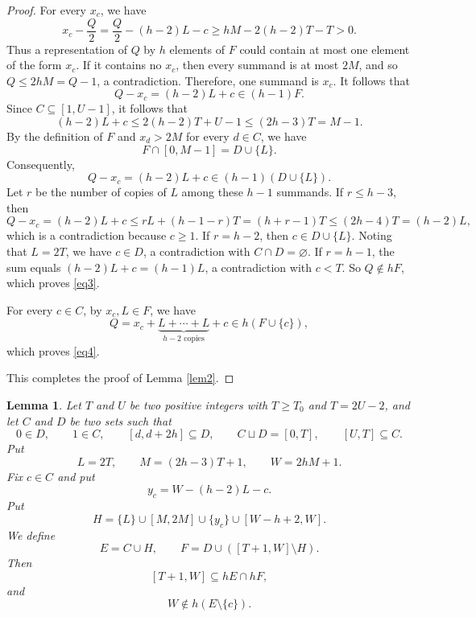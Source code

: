 \documentclass[reqno,12pt,twoside]{article}
\numberwithin{equation}{section}
\newtheorem{lemma}[theorem]{Lemma}
\begin{document}
\begin{proof}
For every $x_c$, we have
\[
 x_c-\frac Q2= \frac Q2-(h-2)L-c
 \ge hM-2(h-2)T-T>0.
\]
Thus a representation of $Q$ by $h$ elements of $F$ could contain at
most one element of the form $x_c$. If it contains no $x_c$, then every summand is at most $2M$, and so
 $Q\leq 2hM=Q-1$, a contradiction. Therefore,
one summand is $x_c$. It follows that
\[
 Q-x_c=(h-2)L+c\in (h-1)F.
\]
Since $C\subseteq[1,U-1]$, it follows that
\[
 (h-2)L+c\le2(h-2)T+U-1\le(2h-3)T=M-1.
\]
By the definition of $F$ and $x_d>2M$ for every $d\in C$, we have
\[
 F\cap[0,M-1]=D\cup\{L\}.
\]
Consequently,
\[
 Q-x_c=(h-2)L+c\in (h-1)(D\cup\{L\}).
\]
Let $r$ be the number of copies of $L$ among these $h-1$ summands.  If
$r\le h-3$, then
\[
 Q-x_c=(h-2)L+c\leq rL+(h-1-r)T=(h+r-1)T\le(2h-4)T=(h-2)L,
\]
which is a contradiction because $c\ge1$.  If
$r=h-2$, then $c\in D\cup\{L\}$.
Noting that $L=2T$, we have $c\in D$, a contradiction with $C\cap D=\varnothing$.
If $r=h-1$, the sum equals $(h-2)L+c=(h-1)L$, a contradiction with $c<T$. So $Q\notin hF$,
which proves \eqref{eq3}.

For every $c\in C$, by $x_c,L\in F$, we have
\[
 Q=x_c+\underbrace{L+\cdots+L}_{h-2\text{ copies}}+c\in h(F\cup\{c\}),
\]
which proves \eqref{eq4}.

This completes the proof of Lemma \ref{lem2}.
\end{proof}

\begin{lemma}\label{lem3}
Let $T$ and $U$ be two positive integers with $T\ge T_0$ and $T=2U-2$, and let $C$ and $D$ be two sets such that
\[
 0\in D,\qquad 1\in C,\qquad [d,d+2h]\subseteq D,\qquad C\sqcup D=[0,T],\qquad [U,T]\subseteq C.
\]
Put
\[
 L=2T,\qquad M=(2h-3)T+1,\qquad W=2hM+1.
\]
Fix $c\in C$ and put
\[
 y_c=W-(h-2)L-c.
\]
Put
\[
 H=\{L\}\cup[M,2M]\cup\{y_c\}\cup[W-h+2,W].
\]
We define
\[
 E=C\cup H,\qquad F=D\cup([T+1,W]\setminus H).
\]
Then
\begin{equation}\label{eq5}
[T+1,W]\subseteq hE\cap hF,
\end{equation}
and
\begin{equation}\label{eq6}
W\notin h(E\setminus\{c\}).
\end{equation}
\end{lemma}
\end{document}
